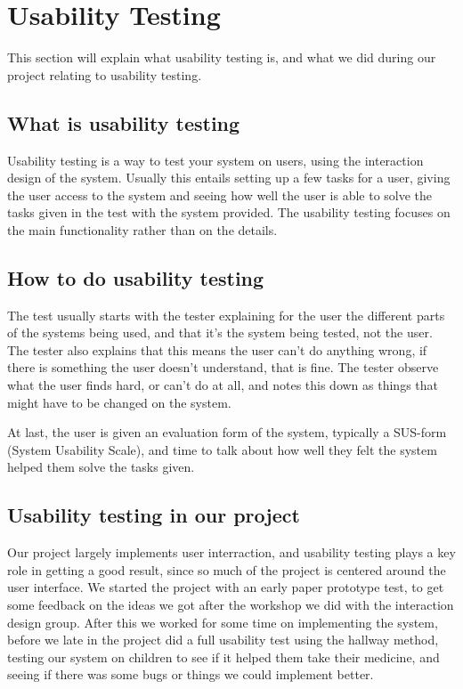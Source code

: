 \chapter{Usability Testing}
\label{sec:Usabilitytesting}
This section will explain what usability testing is, and what we did during our project relating to usability testing.

\section{What is usability testing}
Usability testing is a way to test your system on users, using the interaction design of the system. Usually this entails setting up 
a few tasks for a user, giving the user access to the system and seeing how well the user is able to solve the tasks given in the test
with the system provided. The usability testing focuses on the main functionality rather than on the details. 

\section{How to do usability testing}
The test usually starts with the tester explaining for the user the different parts of the systems being used, and that it's the system being
tested, not the user. The tester also explains that this means the user can't do anything wrong, if there is something the user doesn't 
understand, that is fine. The tester observe what the user finds hard, or can't do at all, and notes this down as things that might have
to be changed on the system. 

At last, the user is given an evaluation form of the system, typically a SUS-form (System Usability Scale), and time to talk about
how well they felt the system helped them solve the tasks given. %

\section{Usability testing in our project}
Our project largely implements user interraction, and usability testing plays a key role in getting a good result, since so much
of the project is centered around the user interface. We started the project with an early paper prototype test, to get some feedback on the ideas
we got after the workshop we did with the interaction design group. After this we worked for some time on implementing the system, before we late in
the project did a full usability test using the hallway method, testing our system on children to see if it helped them take their medicine, and seeing
if there was some bugs or things we could implement better.



